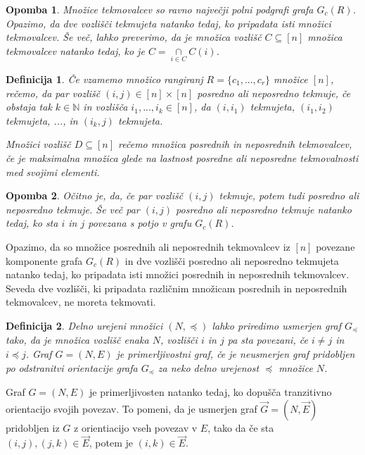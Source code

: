\documentclass[a4paper, 12pt]{book}
\newtheorem{definicija}{Definicija}[chapter]
\newtheorem{opomba}{Opomba}[chapter]
\begin{document}
\begin{opomba}
    Množice tekmovalcev so ravno največji polni podgrafi grafa $G_c(R)$. Opazimo, da dve vozlišči tekmujeta natanko tedaj, ko pripadata isti množici tekmovalcev. Še več, lahko preverimo, da je množica vozlišč $C \subseteq [n]$ množica tekmovalcev natanko tedaj, ko je $C = \underset{i \in C}{\cap}C(i)$.
\end{opomba}

\begin{definicija}
    Če vzamemo množico rangiranj $R = \{ c_1, ..., c_r\}$ množice $[n]$, rečemo, da par vozlišč $(i, j) \in [n] \times [n]$ posredno ali neposredno tekmuje, če obstaja tak $k \in \mathbb{N}$ in vozlišča $i_1, ..., i_k \in [n]$, da $(i, i_1)$ tekmujeta, $(i_1, i_2)$ tekmujeta, ..., in $(i_k, j)$ tekmujeta.

    Množici vozlišč $D \subseteq [n]$ rečemo množica posrednih in neposrednih tekmovalcev, če je maksimalna množica glede na lastnost posredne ali neposredne tekmovalnosti med svojimi elementi.
\end{definicija}

\begin{opomba}
    Očitno je, da, če par vozlišč $(i, j)$ tekmuje, potem tudi posredno ali neposredno tekmuje. Še več par $(i, j)$ posredno ali neposredno tekmuje natanko tedaj, ko sta $i$ in $j$ povezana s potjo v grafu $G_c(R)$.
\end{opomba}

Opazimo, da so množice posrednih ali neposrednih tekmovalcev iz $[n]$ povezane komponente grafa $G_c(R)$ in dve vozlišči posredno ali neposredno tekmujeta natanko tedaj, ko pripadata isti množici posrednih in neposrednih tekmovalcev. Seveda dve vozlišči, ki pripadata različnim množicam posrednih in neposrednih tekmovalcev, ne moreta tekmovati.

\begin{definicija}
    Delno urejeni množici $(N, \preceq)$ lahko priredimo usmerjen graf $G_{\preceq}$ tako, da je množica vozlišč enaka $N$, vozlišči $i$ in $j$ pa sta povezani, če $i \neq j$ in $i \preceq j$.
    Graf $G = (N, E)$ je primerljivostni graf, če je neusmerjen graf pridobljen po odstranitvi orientacije grafa $G_{\preceq}$ za neko delno urejenost $\preceq$  množice $N$.
\end{definicija}
Graf $G = (N, E)$ je primerljivosten natanko tedaj, ko dopušča tranzitivno orientacijo svojih povezav. To pomeni, da je usmerjen graf $\overset{\rightarrow}{G} = (N, \overset{\rightarrow}{E})$ pridobljen iz $G$ z orientiacijo vseh povezav v $E$, tako da če sta $(i, j), (j, k) \in \overset{\rightarrow}{E}$, potem je $(i, k) \in \overset{\rightarrow}{E}$.
\end{document}
